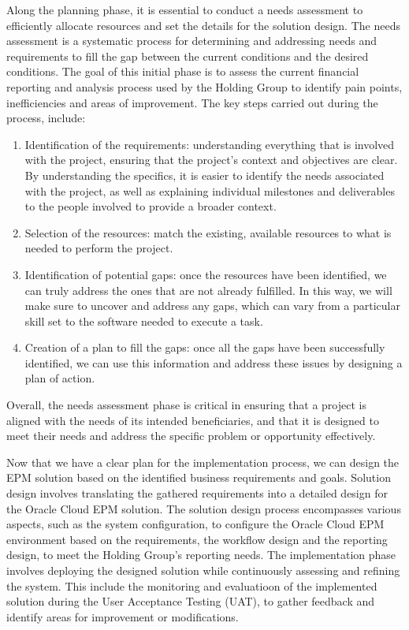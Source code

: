 \documentclass[12pt,a4paper,openright,twoside]{book}
\begin{document}
Along the planning phase, it is essential to conduct a needs assessment to efficiently allocate resources and set the details for the solution design.
%
The needs assessment is a systematic process for determining and addressing needs and requirements to fill the gap between the current conditions and the desired conditions.
%
The goal of this initial phase is to assess the current financial reporting and analysis process used by the Holding Group to identify pain points, inefficiencies and areas of improvement.
%
The key steps carried out during the process, include:

\begin{enumerate}
    \item Identification of the requirements: understanding everything that is involved with the project, ensuring that the project’s context and objectives are clear. By understanding the specifics, it is easier to identify the needs associated with the project, as well as explaining individual milestones and deliverables to the people involved to provide a broader context.
    \item Selection of the resources: match the existing, available resources to what is needed to perform the project. 
    \item Identification of potential gaps: once the resources have been identified, we can truly address the ones that are not already fulfilled. In this way, we will make sure to uncover and address any gaps, which can vary from a particular skill set to the software needed to execute a task. 
    \item Creation of a plan to fill the gaps: once all the gaps have been successfully identified, we can use this information and address these issues by designing a plan of action. 
\end{enumerate}

Overall, the needs assessment phase is critical in ensuring that a project is aligned with the needs of its intended beneficiaries, and that it is designed to meet their needs and address the specific problem or opportunity effectively.

Now that we have a clear plan for the implementation process, we can design the EPM solution based on the identified business requirements and goals.
%
Solution design involves translating the gathered requirements into a detailed design for the Oracle Cloud EPM solution. 
%
The solution design process encompasses various aspects, such as the system configuration, to configure the Oracle Cloud EPM environment based on the requirements, the workflow design and the reporting design, to meet the Holding Group's reporting needs.
%
The implementation phase involves deploying the designed solution while continuously assessing and refining the system. 
%
This include the monitoring and evaluatioon of the implemented solution during the User Acceptance Testing (UAT), to gather feedback and identify areas for improvement or modifications. 
\end{document}
